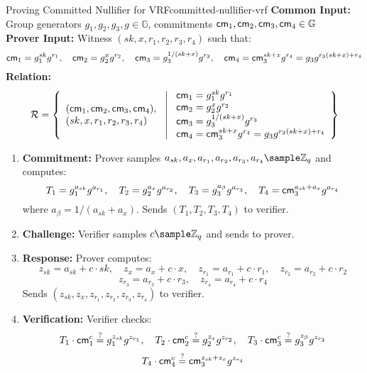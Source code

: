 \begin{protocol}{Proving Committed Nullifier for VRF}{committed-nullifier-vrf}\label{pok-committed-nullifier-vrf}
\textbf{Common Input:} Group generators $g_1, g_2, g_3, g \in \mathbb{G}$, commitments $\mathsf{cm}_1, \mathsf{cm}_2, \mathsf{cm}_3, \mathsf{cm}_4 \in \mathbb{G}$ \\
\textbf{Prover Input:} Witness $(sk, x, r_1, r_2, r_3, r_4)$ such that:
    \[
    \mathsf{cm}_1 = g_1^{sk} g^{r_1}, \quad \mathsf{cm}_2 = g_2^{x} g^{r_2}, \quad \mathsf{cm}_3 = g_3^{1/(sk + x)} g^{r_3}, \quad \mathsf{cm}_4 = \mathsf{cm}_3^{sk + x} g^{r_4} = g_3 g^{r_3 (sk + x) + r_4}
    \]
\textbf{Relation:}
\[
\mathcal{R} = \left\{ 
\begin{array}{l} 
(\mathsf{cm}_1, \mathsf{cm}_2, \mathsf{cm}_3, \mathsf{cm}_4), \\
(sk, x, r_1, r_2, r_3, r_4) 
\end{array}
\ \middle| \
\begin{array}{l}
\mathsf{cm}_1 = g_1^{sk} g^{r_1} \\
\mathsf{cm}_2 = g_2^{x} g^{r_2} \\
\mathsf{cm}_3 = g_3^{1/(sk + x)} g^{r_3} \\
\mathsf{cm}_4 = \mathsf{cm}_3^{sk + x} g^{r_4} = g_3 g^{r_3 (sk + x) + r_4}
\end{array} \right\}
\]
\begin{enumerate}
    \item \textbf{Commitment:} Prover samples $a_{sk}, a_x, a_{r_1}, a_{r_2}, a_{r_3}, a_{r_4} \sample \mathbb{Z}_q$ and computes:
       \[
       T_1 = g_1^{a_{sk}} g^{a_{r_1}}, \quad T_2 = g_2^{a_x} g^{a_{r_2}}, \quad T_3 = g_3^{a_{\beta}} g^{a_{r_3}}, \quad T_4 = \mathsf{cm}_3^{a_{sk} + a_x} g^{a_{r_4}}
       \]
       where $a_{\beta} = 1/(a_{sk} + a_x)$. Sends $(T_1, T_2, T_3, T_4)$ to verifier.
    
    \item \textbf{Challenge:} Verifier samples $c \sample \mathbb{Z}_q$ and sends to prover.
    
    \item \textbf{Response:} Prover computes:
       \[
       z_{sk} = a_{sk} + c \cdot sk, \quad z_x = a_x + c \cdot x, \quad z_{r_1} = a_{r_1} + c \cdot r_1, \quad z_{r_2} = a_{r_2} + c \cdot r_2
       \]
       \[
       z_{r_3} = a_{r_3} + c \cdot r_3, \quad z_{r_4} = a_{r_4} + c \cdot r_4
       \]
       Sends $(z_{sk}, z_x, z_{r_1}, z_{r_2}, z_{r_3}, z_{r_4})$ to verifier.
    
    \item \textbf{Verification:} Verifier checks:
       \[
       T_1 \cdot \mathsf{cm}_1^c \stackrel{?}{=} g_1^{z_{sk}} g^{z_{r_1}}, \quad T_2 \cdot \mathsf{cm}_2^c \stackrel{?}{=} g_2^{z_x} g^{z_{r_2}}, \quad T_3 \cdot \mathsf{cm}_3^c \stackrel{?}{=} g_3^{z_{\beta}} g^{z_{r_3}}
       \]
       \[
       T_4 \cdot \mathsf{cm}_4^c \stackrel{?}{=} \mathsf{cm}_3^{z_{sk} + z_x} g^{z_{r_4}}
       \]
\end{enumerate}
\end{protocol}















